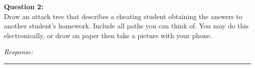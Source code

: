 \documentclass[a4paper, 11pt]{article}
\newenvironment{problem}[2][Question]
               { \begin{mdframed}[backgroundcolor=gray!20] \textbf{#1 #2:} \\}
               {  \end{mdframed}}
\newenvironment{response}
                {\textit{Response:}}
                {}
\begin{document}
 \begin{problem}{2}
   Draw an attack tree that describes a cheating student obtaining the answers to another student’s homework.  Include all paths you can think of.  You may do this electronically, or draw on paper then take a picture with your phone.
 \end{problem}
 
 \begin{response}
 \end{response}
 \noindent\rule{7in}{2.8pt}
\end{document}
